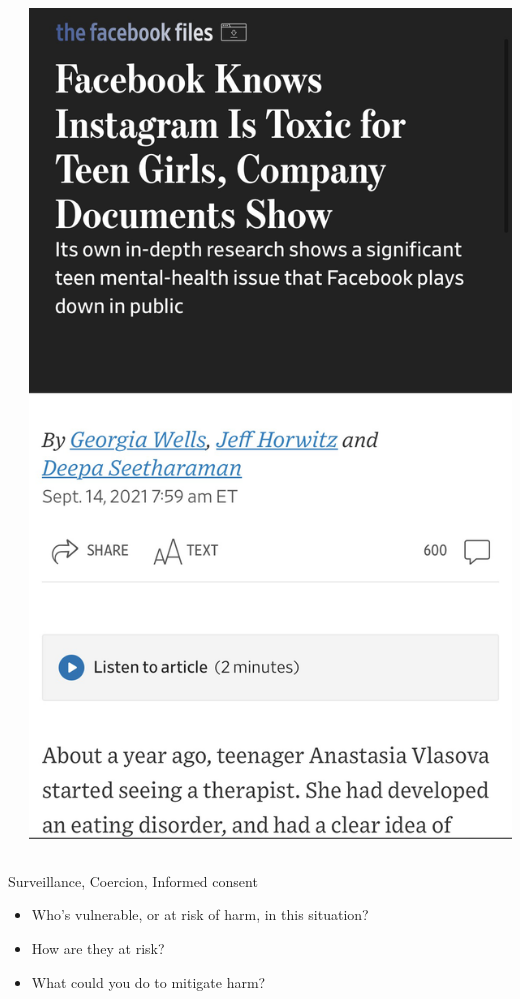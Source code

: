 \documentclass[main]{subfiles}
\begin{document}
\begin{frame}
\begin{columns}
\begin{column}{0.33\textwidth}
\end{column}
\begin{column}{0.33\textwidth}
\centering
\includegraphics[width=\textwidth]{figures/news/pngs/fb_knew.png}
\end{column}
\end{columns}
\end{frame}





\begin{frame}{Surveillance, Coercion, Informed consent}

\centering
{\large \bfseries


    \begin{itemize}
        \item Who's vulnerable, or at risk of harm, in this situation?
        \item How are they at risk?
        \item What could you do to mitigate harm?
      \end{itemize}
}

\end{frame}
\end{document}
